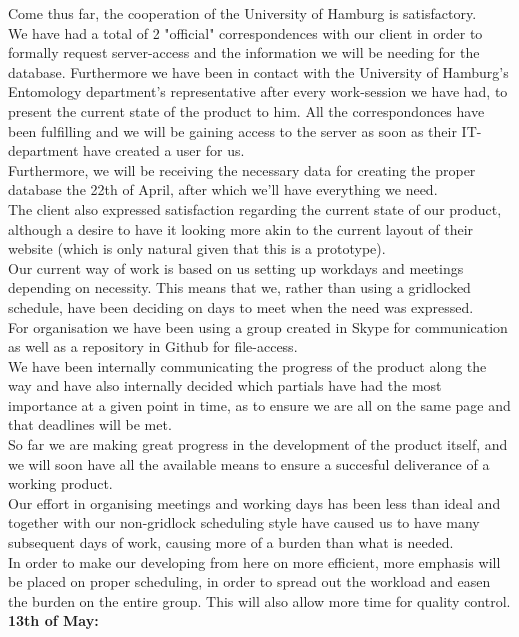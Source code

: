 \documentclass[12pt,a4paper]{article}
\begin{document}
Come thus far, the cooperation of the University of Hamburg is satisfactory.\\
We have had a total of 2 "official" correspondences with our client in order to formally request server-access and the information we will be needing for the database. Furthermore we have been in contact with the University of Hamburg's Entomology department's representative after every work-session we have had, to present the current state of the product to him.
All the correspondonces have been fulfilling and we will be gaining access to the server as soon as their IT-department have created a user for us.\\ Furthermore, we will be receiving the necessary data for creating the proper database the 22th of April, after which we'll have everything we need. \\
The client also expressed satisfaction regarding the current state of our product, although a desire to have it looking more akin to the current layout of their website (which is only natural given that this is a prototype).\\
Our current way of work is based on us setting up workdays and meetings depending on necessity. This means that we, rather than using a gridlocked schedule, have been deciding on days to meet when the need was expressed.\\
For organisation we have been using a group created in Skype for communication as well as a repository in Github for file-access. \\
We have been internally communicating the progress of the product along the way and have also internally decided which partials have had the most importance at a given point in time, as to ensure we are all on the same page and that deadlines will be met.\\

So far we are making great progress in the development of the product itself, and we will soon have all the available means to ensure a succesful deliverance of a working product.\\
Our effort in organising meetings and working days has been less than ideal and together with our non-gridlock scheduling style have caused us to have many subsequent days of work, causing more of a burden than what is needed.\\
In order to make our developing from here on more efficient, more emphasis will be placed on proper scheduling, in order to spread out the workload and easen the burden on the entire group. This will also allow more time for quality control.\\
\newpage
{\bf 13th of May:}
\end{document}
